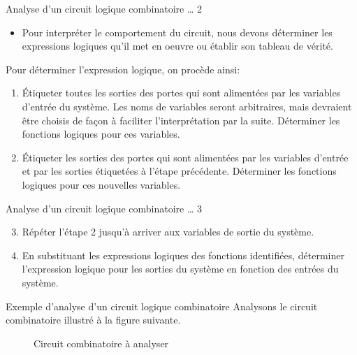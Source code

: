 \documentclass[presentation]{beamer}
\begin{document}
\begin{frame}[label={sec:org0d8f92f}]{Analyse d'un circuit logique combinatoire \ldots{} 2}
\begin{itemize}
\item Pour interpréter le comportement du circuit, nous devons déterminer les expressions logiques qu'il met en oeuvre ou établir son tableau de vérité.
\end{itemize}


Pour déterminer l'expression logique, on procède ainsi:
\begin{enumerate}
\item Étiqueter toutes les sorties des portes qui sont alimentées par les
variables d'entrée du système. Les noms de variables seront
arbitraires, mais devraient être choisis de façon à faciliter
l'interprétation par la suite. Déterminer les fonctions logiques
pour ces variables.
\item Étiqueter les sorties des portes qui sont alimentées par les
variables d'entrée et par les sorties étiquetées à l'étape
précédente. Déterminer les fonctions logiques pour ces nouvelles
variables.
\end{enumerate}
\end{frame}

\begin{frame}[label={sec:org4bc8bd6}]{Analyse d'un circuit logique combinatoire \ldots{} 3}
\begin{enumerate}
\setcounter{enumi}{2}
\item Répéter l'étape 2 jusqu'à arriver aux variables de sortie du système.
\item En substituant les expressions logiques des fonctions identifiées,
déterminer l'expression logique pour les sorties du système en
fonction des entrées du système.
\end{enumerate}
\end{frame}

\begin{frame}[label={sec:org6d638b6}]{Exemple d'analyse d'un circuit logique combinatoire}
Analysons le circuit combinatoire illustré à la figure
suivante.

\begin{figure}[htbp]
\centering

\caption{\label{fig:org3970ce2}Circuit combinatoire à analyser}
\end{figure}
\end{frame}
\end{document}
